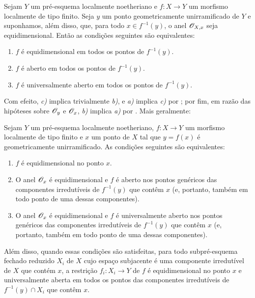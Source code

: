 
\begin{corollary}[14.4.6]
\label{IV.14.4.6}
Sejam $Y$ um pré-esquema localmente noetheriano e $f:X\to Y$ um morfismo localmente de tipo finito.
Seja $y$ um ponto geometricamente unirramificado de $Y$ e suponhamos, além disso, que, para todo $x\in f^{-1}(y)$, o anel $\mathscr{O}_{X,x}$ seja equidimensional.
Então as condições seguintes são equivalentes:
\begin{enumerate}[label=\emph{\alph*)}]
  \item $f$ é equidimensional  em todos os pontos de $f^{-1}(y)$.
  \item $f$ é aberto em todos os pontos de $f^{-1}(y)$.
  \item $f$ é universalmente aberto em todos os pontos de $f^{-1}(y)$.
\end{enumerate}
\end{corollary}

Com efeito, \emph{c)} implica trivialmente \emph{b)}, e \emph{a)} implica \emph{c)} por ; por fim, em razão das hipóteses sobre $\mathscr{O}_y$ e $\mathscr{O}_x$, \emph{b)} implica \emph{a)} por .
Mais geralmente:

\begin{proposition}[14.4.7]
\label{IV.14.4.7}
Sejam $Y$ um pré-esquema localmente noetheriano, $f:X\to Y$ um morfismo localmente de tipo finito e $x$ um ponto de $X$ tal que $y=f(x)$ é geometricamente unirramificado.
As condições seguintes são equivalentes:
\begin{enumerate}[label=\emph{\alph*)}]
  \item $f$ é equidimensional  no ponto $x$.
  \item O anel $\mathscr{O}_x$ é equidimensional e $f$ é aberto nos pontos genéricos das componentes irredutíveis de $f^{-1}(y)$ que contêm $x$ (e, portanto, também em todo ponto de uma dessas componentes).
  \item O anel $\mathscr{O}_x$ é equidimensional e $f$ é universalmente aberto nos pontos genéricos das componentes irredutíveis de $f^{-1}(y)$ que contêm $x$ (e, portanto, também em todo ponto de uma dessas componentes).
\end{enumerate}
Além disso, quando essas condições são satisfeitas, para todo subpré-esquema fechado reduzido $X_i$ de $X$ cujo espaço subjacente é uma componente irredutível de $X$ que contém $x$, a restrição $f_i:X_i\to Y$ de $f$ é equidimensional no ponto $x$ e universalmente aberta em todos os pontos das componentes irredutíveis de $f^{-1}(y)\cap X_i$ que contêm $x$.
\end{proposition}

